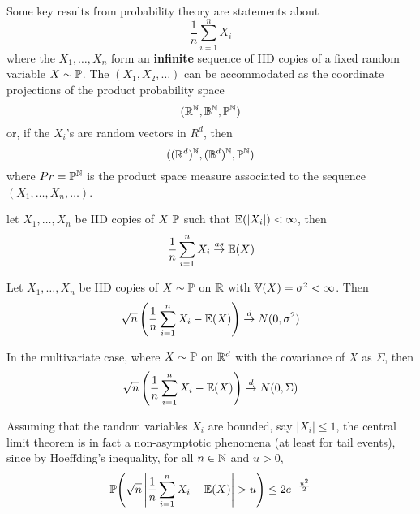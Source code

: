 Some key results from probability theory are statements about
\begin{equation}
  \label{eq:15}
  \frac{1}{n} \sum_{i=1}^{n} X_{i}
\end{equation} where the $X_{1}, \dots, X_{n}$ form an
\textbf{infinite} sequence of IID copies of a fixed random variable $X
\sim \Prob$.  The $(X_{1}, X_{2}, \dots)$ can be accommodated as the
coordinate projections of the product probability space
\begin{equation}
  \label{eq:16}
  (\R^{\N}, \mathbb{B}^{\N}, \Prob^{\N})
\end{equation} or, if the $X_{i}$'s are random vectors in $R^{d}$,
then
\begin{equation}
  \label{eq:17}
  ((\R^{d})^{\N}, (\mathbb{B}^{d})^{\N}, \Prob^{\N})
\end{equation} where $Pr = \Prob^{\N}$ is the product space measure
associated to the sequence $(X_{1}, \dots, X_{n}, \dots)$.

\begin{thm}
  \label{defn:stochastic_convergence_concepts:1}
  let $X_{1}, \dots, X_n$ be IID copies of $X ~ \Prob$ such that
  $\E{|X_{i}|} < \infty$, then
  \begin{equation}
    \label{eq:18}
    \frac{1}{n} \sum_{i=1}^{n} X_{i} \cas \E{X}
  \end{equation}
\end{thm}

\begin{thm}
  \label{defn:stochastic_convergence_concepts:2}
  Let $X_{1}, \dots, X_{n}$ be IID copies of $X \sim \Prob$ on $\mathbb{R}$
  with $\Var{X} = \sigma^{2} < \infty$.  Then
  \begin{equation}
    \label{eq:19}
    \sqrt{n}\left(\frac{1}{n} \sum_{i=1}^{n} X_{i} - \E{X}\right) \cd N(0, \sigma^{2})
  \end{equation}

  In the multivariate case, where $X \sim \Prob$ on $\mathbb{R}^{d}$ with the
  covariance of $X$ as $\Sigma$, then
  \begin{equation}
    \label{eq:21}
    \sqrt{n} \left(\frac{1}{n} \sum_{i=1}^{n} X_{i} - \E{X}\right) \cd N(0, \Sigma)
  \end{equation}
\end{thm}

Assuming that the random variables $X_{i}$ are bounded, say $|X_{i}|
\leq 1$, the central limit theorem is in fact a non-asymptotic
phenomena (at least for tail events), since by Hoeffding's inequality,
for all $n \in \mathbb{N}$ and $u > 0$,
\begin{equation}
  \label{eq:22}
  \Prob{\sqrt{n} \left| \frac{1}{n} \sum_{i=1}^{n}X_{i} - \E{X}
    \right| > u} \leq 2 e^{-\frac{u^{2}}{2}}
\end{equation}

